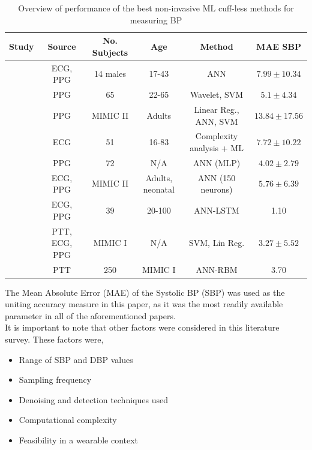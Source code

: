 \begin{table}[H]
\caption{Overview of performance of  the best non-invasive ML cuff-less methods for measuring BP}
\begin{tabular}{|c|c|c|c|c|c|}
\hline
\textbf{Study} & \textbf{Source} & \textbf{No. Subjects} & \textbf{Age} & \textbf{Method} & \textbf{MAE SBP} \\ \hline
\cite{Yang2020} & ECG, PPG & 14 males & 17-43 & ANN & $7.99 \pm 10.34$\\
\cite{Gao2016} & PPG & 65 & 22-65 & Wavelet, SVM & $5.1 \pm 4.34$\\
\cite{Kachuee2015} & PPG & MIMIC II & Adults & Linear Reg., ANN, SVM &  $13.84\pm  17.56$\\
\cite{Simjanoska20182} & ECG & 51 & 16-83 & Complexity analysis + ML &  $7.72 \pm  10.22$\\ 
\cite{Wang2018} & PPG & 72 & N/A & ANN (MLP) & $4.02 \pm 2.79$\\
\cite{Pradenas2020} & ECG, PPG & MIMIC II & Adults,  neonatal & ANN (150 neurons) & $5.76 \pm 6.39$\\
\cite{Tanveer2018} & ECG, PPG & 39 & 20-100 & ANN-LSTM & 1.10\\
\cite{Chen2019} & PTT, ECG, PPG & MIMIC I & N/A & SVM, Lin Reg. & $3.27 \pm 5.52$\\ 
\cite{Ripoll2019} & PTT & 250 & MIMIC I & ANN-RBM & 3.70\\\hline
\end{tabular}
\label{litsurveytab2}
\end{table} \noindent The Mean Absolute Error (MAE) of the Systolic BP (SBP) was used as the uniting accuracy measure in this paper, as it was the most readily available parameter in all of the aforementioned papers. \\ \newline \noindent It is important to note that other factors were considered in this literature survey. These factors were, \begin{itemize}
    \item Range of SBP and DBP values 
    \item Sampling frequency
    \item Denoising and detection techniques used
    \item Computational complexity
    \item Feasibility in a wearable context

\end{itemize}
